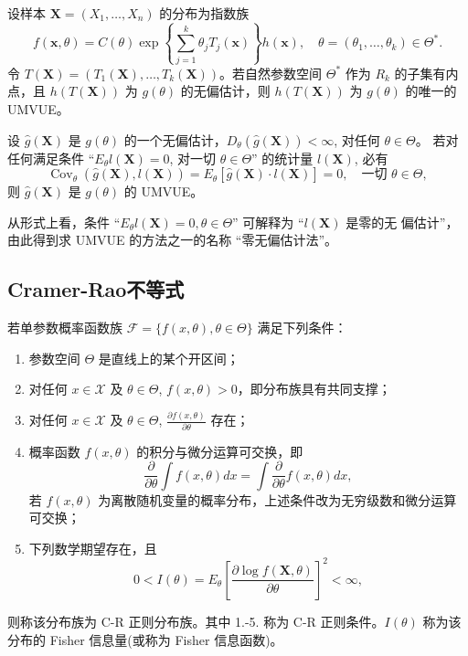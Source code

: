 \begin{corollary}\label{cor:3.4.2}
    设样本 $\mathbf{X} = (X_1, \dots, X_n)$ 的分布为指数族
$$f(\mathbf{x}, \theta) = C(\theta) \exp\left\{\sum_{j=1}^k \theta_j T_j(\mathbf{x})\right\} h(\mathbf{x}), \quad \theta = (\theta_1, \dots, \theta_k) \in \Theta^*.$$
令 $T(\mathbf{X}) = (T_1(\mathbf{X}), \dots, T_k(\mathbf{X}))$。若自然参数空间 $\Theta^*$ 作为 $R_k$ 的子集有内点，且
$h(T(\mathbf{X}))$ 为 $g(\theta)$ 的无偏估计，则 $h(T(\mathbf{X}))$ 为 $g(\theta)$ 的唯一的 UMVUE。
\end{corollary}

\begin{theorem}[零无偏估计法]\label{thm:3.4.1}
    设 $\hat{g}(\mathbf{X})$ 是 $g(\theta)$ 的一个无偏估计，$D_\theta(\hat{g}(\mathbf{X})) < \infty$, 对任何 $\theta \in \Theta$。
若对任何满足条件 “$E_\theta l(\mathbf{X})=0$, 对一切 $\theta \in \Theta$” 的统计量 $l(\mathbf{X})$, 必有
\begin{equation}
\operatorname{Cov}_\theta(\hat{g}(\mathbf{X}), l(\mathbf{X})) = E_\theta[\hat{g}(\mathbf{X}) \cdot l(\mathbf{X})] = 0, \quad \text{一切 } \theta \in \Theta, \label{eq:covariance_condition}
\end{equation}
则 $\hat{g}(\mathbf{X})$ 是 $g(\theta)$ 的 UMVUE。
\end{theorem}


\begin{remark}
    从形式上看，条件 “$E_\theta l(\mathbf{X})=0, \theta \in \Theta$” 可解释为 “$l(\mathbf{X})$ 是零的无
偏估计”，由此得到求 UMVUE 的方法之一的名称 “零无偏估计法”。
\end{remark}

\subsection{Cramer-Rao不等式}\label{subsec:C-R inequality}
\begin{definition}[C-R 正则分布族]\label{def:CR_regular_family}
若单参数概率函数族 $\mathcal{F}=\{f(x, \theta), \theta \in \Theta\}$ 满足下列条件：
\begin{enumerate}
    \item 参数空间 $\Theta$ 是直线上的某个开区间；
    \item 对任何 $x \in \mathcal{X}$ 及 $\theta \in \Theta$, $f(x, \theta)>0$，即分布族具有共同支撑；
    \item 对任何 $x \in \mathcal{X}$ 及 $\theta \in \Theta$, $\frac{\partial f(x, \theta)}{\partial \theta}$ 存在；
    \item 概率函数 $f(x, \theta)$ 的积分与微分运算可交换，即
    $$\frac{\partial}{\partial \theta}\int f(x, \theta)dx = \int \frac{\partial}{\partial \theta}f(x, \theta)dx,$$
    若 $f(x, \theta)$ 为离散随机变量的概率分布，上述条件改为无穷级数和微分运算可交换；
    \item 下列数学期望存在，且
    $$0 < I(\theta) = E_\theta\left[\frac{\partial \log f(\mathbf{X}, \theta)}{\partial \theta}\right]^2 < \infty,$$
\end{enumerate}
则称该分布族为 C-R 正则分布族。其中 1.-5. 称为 C-R 正则条件。$I(\theta)$ 称为该分布的 Fisher 信息量(或称为 Fisher 信息函数)。
\end{definition}

